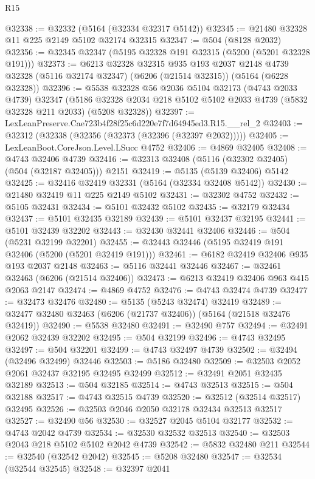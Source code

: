 \begin{lexlean}{R15}
\begin{coremodule}
{{{{{{{{{{{@32338 := @32332 (@5164 (@32334 @32317 @5142))
@32345 := @21480 @32328 @11 @225 @2149 @5102 @32174 @32315
@32347 := @504 (@8128 @2032)
@32356 := @32345 @32347 (@5195 @32328 @191 @32315 (@5200 (@5201 @32328 @191)))
@32373 := @6213
    @32328
    @32315
    @935
    @193
    @2037
    @2148
    @4739
    @32328
    (@5116 @32174 @32347)
    (@6206 (@21514 @32315))
    (@5164 (@6228 @32328))
@32396 := @5538
    @32328
    @56
    @2036
    @5104
    @32173
    (@4743 @2033 @4739)
    @32347
    (@5186 @32328 @2034 @218 @5102 @5102 @2033 @4739 (@5832 @32328 @211 @2033) (@5208 @32328))
@32397 := LexLeanPreserve.Cae723b4f28f25c6d220e7f7d64945ed3.R15.__rel_2
@32403 := @32312 (@32338 (@32356 (@32373 (@32396 (@32397 @2032)))))
@32405 := LexLeanBoot.CoreJson.Level.LSucc @4752
@32406 := @4869 @32405
@32408 := @4743 @32406 @4739
@32416 := @32313 @32408 (@5116 (@32302 @32405) (@504 (@32187 @32405))) @2151
@32419 := @5135 (@5139 @32406) @5142
@32425 := @32416 @32419 @32331 (@5164 (@32334 @32408 @5142))
@32430 := @21480 @32419 @11 @225 @2149 @5102
@32431 := @32302 @4752
@32432 := @5105 @32431
@32434 := @5101 @32432 @5102
@32435 := @32179 @32434
@32437 := @5101 @32435 @32189
@32439 := @5101 @32437 @32195
@32441 := @5101 @32439 @32202
@32443 := @32430 @32441 @32406
@32446 := @504 (@5231 @32199 @32201)
@32455 := @32443 @32446 (@5195 @32419 @191 @32406 (@5200 (@5201 @32419 @191)))
@32461 := @6182 @32419 @32406 @935 @193 @2037 @2148
@32463 := @5116 @32441 @32446
@32467 := @32461 @32463 (@6206 (@21514 @32406))
@32473 := @6213 @32419 @32406 @963 @415 @2063 @2147
@32474 := @4869 @4752
@32476 := @4743 @32474 @4739
@32477 := @32473 @32476
@32480 := @5135 (@5243 @32474) @32419
@32489 := @32477 @32480 @32463 (@6206 (@21737 @32406)) (@5164 (@21518 @32476 @32419))
@32490 := @5538 @32480
@32491 := @32490 @757
@32494 := @32491 @2062 @32439 @32202
@32495 := @504 @32199
@32496 := @4743 @32495
@32497 := @504 @32201
@32499 := @4743 @32497 @4739
@32502 := @32494 (@32496 @32499) @32446
@32503 := @5186 @32480
@32509 := @32503 @2052 @2061 @32437 @32195 @32495 @32499
@32512 := @32491 @2051 @32435 @32189
@32513 := @504 @32185
@32514 := @4743 @32513
@32515 := @504 @32188
@32517 := @4743 @32515 @4739
@32520 := @32512 (@32514 @32517) @32495
@32526 := @32503 @2046 @2050 @32178 @32434 @32513 @32517
@32527 := @32490 @56
@32530 := @32527 @2045 @5104 @32177
@32532 := @4743 @2042 @4739
@32534 := @32530 @32532 @32513
@32540 := @32503 @2043 @218 @5102 @5102 @2042 @4739
@32542 := @5832 @32480 @211
@32544 := @32540 (@32542 @2042)
@32545 := @5208 @32480
@32547 := @32534 (@32544 @32545)
@32548 := @32397 @2041
}}}}}}}}}}}
\end{coremodule}
\end{lexlean}

